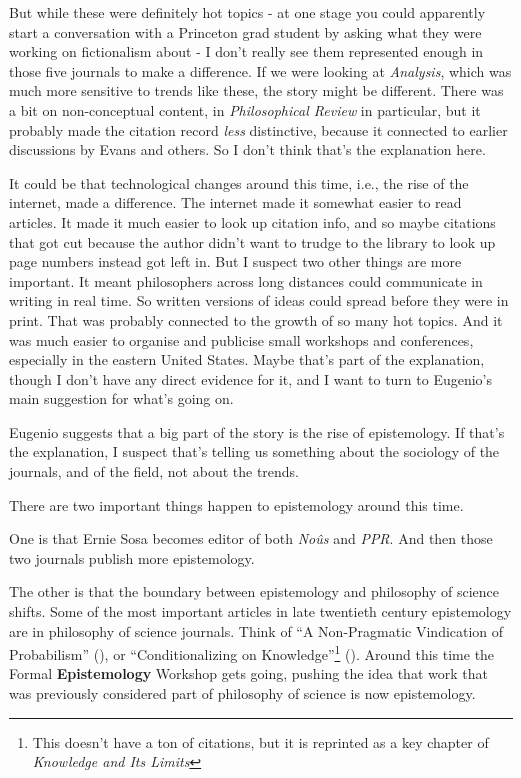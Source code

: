 \documentclass[
  10pt,
  letterpaper,
  DIV=11,
  numbers=noendperiod,
  twoside]{scrartcl}
\begin{document}
But while these were definitely hot topics - at one stage you could
apparently start a conversation with a Princeton grad student by asking
what they were working on fictionalism about - I don't really see them
represented enough in those five journals to make a difference. If we
were looking at \emph{Analysis}, which was much more sensitive to trends
like these, the story might be different. There was a bit on
non-conceptual content, in \emph{Philosophical Review} in particular,
but it probably made the citation record \emph{less} distinctive,
because it connected to earlier discussions by Evans and others. So I
don't think that's the explanation here.

It could be that technological changes around this time, i.e., the rise
of the internet, made a difference. The internet made it somewhat easier
to read articles. It made it much easier to look up citation info, and
so maybe citations that got cut because the author didn't want to trudge
to the library to look up page numbers instead got left in. But I
suspect two other things are more important. It meant philosophers
across long distances could communicate in writing in real time. So
written versions of ideas could spread before they were in print. That
was probably connected to the growth of so many hot topics. And it was
much easier to organise and publicise small workshops and conferences,
especially in the eastern United States. Maybe that's part of the
explanation, though I don't have any direct evidence for it, and I want
to turn to Eugenio's main suggestion for what's going on.

Eugenio suggests that a big part of the story is the rise of
epistemology. If that's the explanation, I suspect that's telling us
something about the sociology of the journals, and of the field, not
about the trends.

There are two important things happen to epistemology around this time.

One is that Ernie Sosa becomes editor of both \emph{Noûs} and
\emph{PPR}. And then those two journals publish more epistemology.

The other is that the boundary between epistemology and philosophy of
science shifts. Some of the most important articles in late twentieth
century epistemology are in philosophy of science journals. Think of ``A
Non-Pragmatic Vindication of Probabilism''
(), or ``Conditionalizing on
Knowledge''\footnote{This doesn't have a ton of citations, but it is
  reprinted as a key chapter of \emph{Knowledge and Its Limits}}
(). Around this time the
Formal \textbf{Epistemology} Workshop gets going, pushing the idea that
work that was previously considered part of philosophy of science is now
epistemology.
\end{document}
